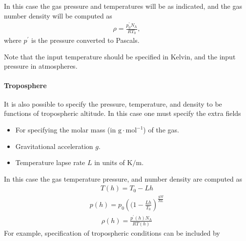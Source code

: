 \documentclass[letterpaper,10pt,english]{sphinxmanual}
\begin{document}
\sphinxAtStartPar
In this case the gas pressure and temperatures will be as indicated, and the gas number density will be computed as
\begin{equation*}
\begin{split}\rho = \frac{p_0^\prime N_{\textrm{A}}}{RT_0},\end{split}
\end{equation*}
\sphinxAtStartPar
where \(p^\prime\) is the pressure converted to Pascals.

\sphinxAtStartPar
Note that the input temperature should be specified in Kelvin, and the input pressure in atmospheres.


\paragraph{Troposphere}
\label{\detokenize{Applications/CdrPlasmaModel:troposphere}}
\sphinxAtStartPar
It is also possible to specify the pressure, temperature, and density to be functions of tropospheric altitude.
In this case one must specify the extra fields
\begin{itemize}
\item {} 
\sphinxAtStartPar
{} For specifying the molar mass (in \(\textrm{g}\cdot\textrm{mol}^{-1}\)) of the gas.

\item {} 
\sphinxAtStartPar
{} Gravitational acceleration \(g\).

\item {} 
\sphinxAtStartPar
{} Temperature lapse rate \(L\) in units of \(\textrm{K}/\textrm{m}\).

\end{itemize}

\sphinxAtStartPar
In this case the gas temperature pressure, and number density are computed as
\begin{equation*}
\begin{split}T(h) = T_0 - Lh\end{split}
\end{equation*}\begin{equation*}
\begin{split}p(h) = p_0\left((1 - \frac{Lh}{T_0}\right)^{\frac{g M}{RL}}\end{split}
\end{equation*}\begin{equation*}
\begin{split}\rho(h) = \frac{p^\prime(h) N_{\textrm{A}}}{RT(h)}\end{split}
\end{equation*}
\sphinxAtStartPar
For example, specification of tropospheric conditions can be included by
\end{document}
